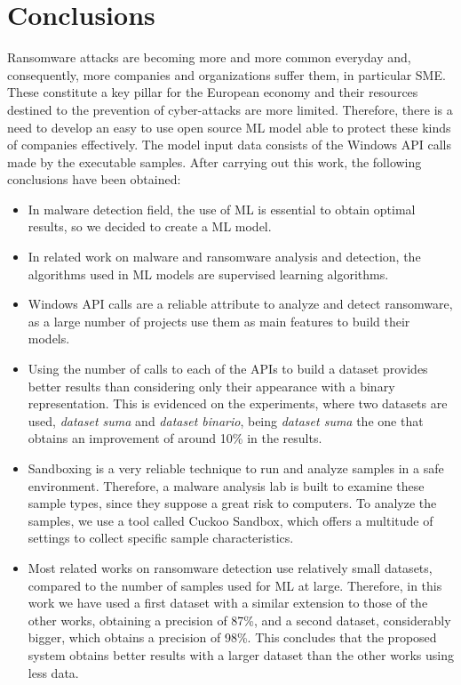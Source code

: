 \section{Conclusions}
\noindent Ransomware attacks are becoming more and more common everyday and, consequently, more companies and organizations suffer them, in particular \gls{SME}. These constitute a key pillar for the European economy and their resources destined to the prevention of cyber-attacks are more limited. Therefore, there is a need to develop an easy to use open source ML model able to protect these kinds of companies effectively. The model input data consists of the Windows \gls{API} calls made by the executable samples. After carrying out this work, the following conclusions have been obtained:

\begin{itemize}
    \item In malware detection field, the use of \gls{ML} is essential to obtain optimal results, so we decided to create a \gls{ML} model.
    
    \item In related work on malware and ransomware analysis and detection, the algorithms used in \gls{ML} models are supervised learning algorithms.
    
    \item Windows \gls{API} calls are a reliable attribute to analyze and detect ransomware, as a large number of projects use them as main features to build their models.
    
    \item Using the number of calls to each of the \gls{API}s to build a dataset provides better results than considering only their appearance with a binary representation. This is evidenced on the experiments, where two datasets are used, \textit{dataset suma} and \textit{dataset binario}, being \textit{dataset suma} the one that obtains an improvement of around 10\% in the results.
    
    \item Sandboxing is a very reliable technique to run and analyze samples in a safe environment. Therefore, a malware analysis lab is built to examine these sample types, since they suppose a great risk to computers. To analyze the samples, we use a tool called Cuckoo Sandbox, which offers a multitude of settings to collect specific sample characteristics.
    
    \item Most related works on ransomware detection use relatively small datasets, compared to the number of samples used for \gls{ML} at large. Therefore, in this work we have used a first dataset with a similar extension to those of the other works, obtaining a precision of 87\%, and a second dataset, considerably bigger, which obtains a precision of 98\%. This concludes that the proposed system obtains better results with a larger dataset than the other works using less data.
    

\end{itemize}
